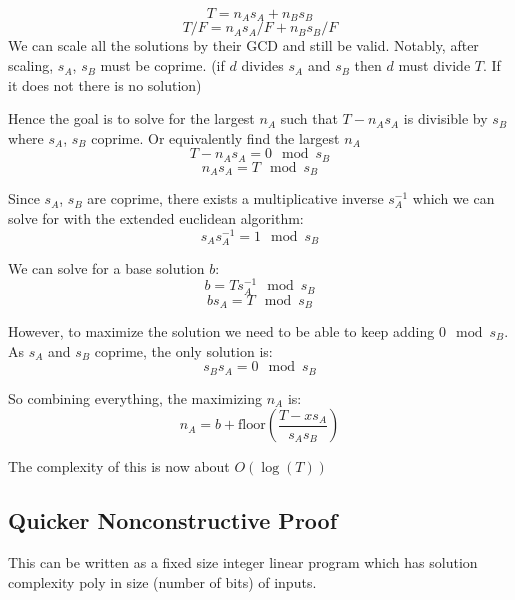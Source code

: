 \documentclass{article}
\begin{document}
\[
T = n_A s_A + n_B s_B
\]
\[
T/F = n_A s_A/F + n_B s_B/F
\]
We can scale all the solutions by their GCD and still be valid.
Notably, after scaling, $s_A$, $s_B$ must be coprime.
(if $d$ divides $s_A$ and $s_B$ then $d$ must divide $T$. If it does not there is no solution)

Hence the goal is to solve for the largest $n_A$ such that $T-n_A s_A$ is divisible by $s_B$ where $s_A$, $s_B$ coprime.
Or equivalently find the largest $n_A$
\[
T - n_A s_A  = 0 \mod s_B
\]
\[
n_A s_A  = T \mod s_B
\]

Since $s_A$, $s_B$ are coprime, there exists a multiplicative inverse $s_A^{-1}$
which we can solve for with the extended euclidean algorithm:
\[
  s_A s_A^{-1} = 1 \mod s_B
\]

We can solve for a base solution $b$:
\[
  b = T s_A^{-1} \mod s_B
\]
\[
  b s_A  = T \mod s_B
\]

However, to maximize the solution we need to be able to keep adding $0 \mod s_B$.
As $s_A$ and $s_B$ coprime, the only solution is:
\[
  s_B s_A  = 0 \mod s_B
\]

So combining everything, the maximizing $n_A$ is:
\[
n_A = b + \text{floor}(\frac{T - x s_A}{s_A s_B})
\]

The complexity of this is now about $O(\log(T))$

\subsection*{Quicker Nonconstructive Proof}
This can be written as a fixed size integer linear program which has solution 
complexity poly in size (number of bits) of inputs.
\end{document}
